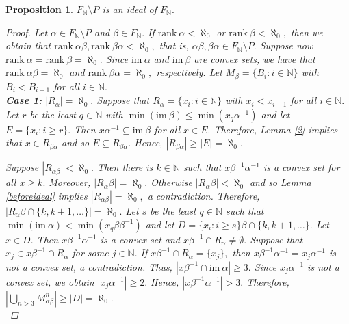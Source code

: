 \documentclass[11pt]{article}
\theoremstyle{plain}
\newtheorem{proposition}[theorem]{Proposition}
\theoremstyle{definition}
\newcommand{\rank}{\mathrm{rank~}}
\newcommand{\im}{\mathrm{im~}}
\begin{document}
\begin{proposition}\label{ideal}
$F_{\mathbb{N}}\setminus P$ is an ideal of $F_{\mathbb{N}}.$
\begin{proof}
Let $\alpha\in F_{\mathbb{N}}\setminus P$ and $\beta\in F_{\mathbb{N}}.$ If $\rank\alpha<\aleph_{0}$ or $\rank\beta<\aleph_{0},$ then we obtain that $\rank\alpha\beta,\rank\beta\alpha<\aleph_{0},$ that is, $\alpha\beta, \beta\alpha\in F_{\mathbb{N}}\setminus P.$ Suppose now $\rank\alpha=\rank\beta=\aleph_{0}.$ Since $\im\alpha$ and $\im\beta$ are convex sets, we have that $\rank\alpha\beta=\aleph_{0}$ and $\rank\beta\alpha=\aleph_{0},$ respectively. Let $M_{\beta}=\{B_{i}:i\in\mathbb{N}\}$ with $B_{i}<B_{i+1}$ for all $i\in\mathbb{N}.$\\

\noindent\textbf{Case 1:} $\left\vert R_{\alpha}\right\vert=\aleph_{0}.$ Suppose that $R_{\alpha}=\{x_{i}:i\in\mathbb{N}\}$ with $x_{i}<x_{i+1}$ for all $i\in\mathbb{N}.$ Let $r$ be the least $q\in\mathbb{N}$ with $\min(\im\beta)\leq\min (x_{q}\alpha^{-1})$ and let $E=\{x_{i}:i\geq r\}.$ Then $x\alpha^{-1}\subseteq\im\beta$ for all $x\in E.$ Therefore, Lemma \ref{2} implies that $x\in R_{\beta\alpha}$ and so $E\subseteq R_{\beta\alpha}.$ Hence, $\left\vert R_{\beta\alpha}\right\vert\geq \left\vert E\right\vert=\aleph_{0}.$ 

Suppose $\left\vert R_{\alpha\beta}\right\vert<\aleph_{0}.$ Then there is $k\in\mathbb{N}$ such that $x\beta^{-1}\alpha^{-1}$ is a convex set for all $x\geq k.$ Moreover, $\left\vert R_{\alpha}\beta\right\vert=\aleph_{0}.$ Otherwise $\left\vert R_{\alpha}\beta\right\vert<\aleph_{0}$ and so Lemma \ref{beforeideal} implies $\left\vert R_{\alpha\beta}\right\vert=\aleph_{0},$ a contradiction. Therefore, $\left\vert R_{\alpha}\beta\cap\{k,k+1,\ldots\}\right\vert=\aleph_{0}.$ Let $s$ be the least $q\in\mathbb{N}$ such that $\min(\im\alpha)<\min(x_{q}\beta\beta^{-1})$ and let $D=\{x_{i}:i\geq s\}\beta\cap\{k,k+1,\ldots\}.$ Let $x\in D.$ Then $x\beta^{-1}\alpha^{-1}$ is a convex set and $x\beta^{-1}\cap R_{\alpha}\not=\emptyset.$ Suppose that $x_{j}\in x\beta^{-1}\cap R_{\alpha}$ for some $j\in\mathbb{N}.$ If $x\beta^{-1}\cap R_{\alpha}=\{x_{j}\},$ then $x\beta^{-1}\alpha^{-1}=x_{j}\alpha^{-1}$ is not a convex set, a contradiction. Thus, $\left\vert x\beta^{-1}\cap\im\alpha\right\vert\geq 3.$ Since $x_{j}\alpha^{-1}$ is not a convex set, we obtain $\left\vert x_{j}\alpha^{-1}\right\vert\geq 2.$ Hence, $\left\vert x\beta^{-1}\alpha^{-1}\right\vert>3.$ Therefore, $\left\vert\bigcup_{n>3}M^{n}_{\alpha\beta}\right\vert\geq\left\vert D\right\vert=\aleph_{0}.$\\



\end{proof}
\end{proposition}
\end{document}
